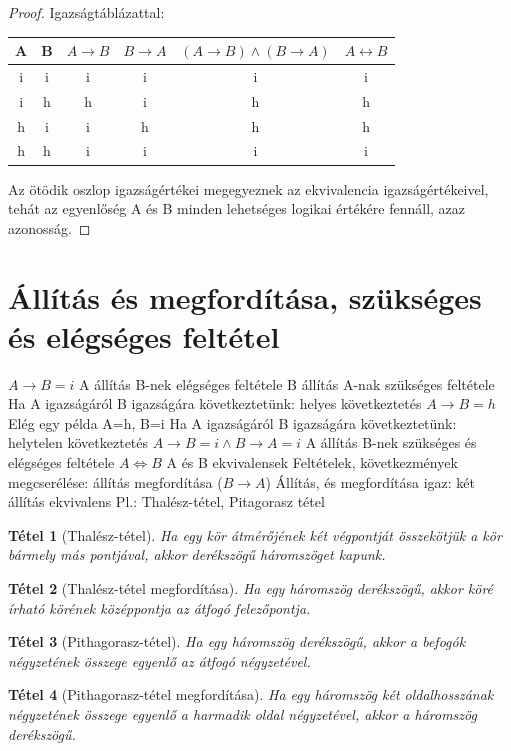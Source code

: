 \documentclass[twoside,12pt]{report}
\newtheorem{theorem}{Tétel}[section]
\theoremstyle{definition}
\begin{document}
	\begin{proof}
		Igazságtáblázattal:
		\begin{table}[H]
			\begin{tabular}{|c|c|c|c|c|c|}
				\hline
				A&B&$A\rightarrow B$&$B\rightarrow A$&$(A\rightarrow B)\wedge(B\rightarrow A)$&$A\leftrightarrow B$\\\hline
				i&i&i&i&i&i\\\hline
				i&h&h&i&h&h\\\hline
				h&i&i&h&h&h\\\hline
				h&h&i&i&i&i\\\hline
			\end{tabular}
		\end{table}
		Az ötödik oszlop igazságértékei megegyeznek az ekvivalencia igazságértékeivel, tehát az
		egyenlőség A és B minden lehetséges logikai értékére fennáll, azaz azonosság.
	\end{proof}
\section{Állítás és megfordítása, szükséges és elégséges feltétel}
	\begin{outline}
		\1 $A\rightarrow B=i$
			\2 A állítás B-nek elégséges feltétele
			\2 B állítás A-nak szükséges feltétele
			\2 Ha A igazságáról B igazságára következtetünk: helyes következtetés
		\1 $A\rightarrow B=h$
			\2 Elég egy példa A=h, B=i
			\2 Ha A igazságáról B igazságára következtetünk: helytelen következtetés
		\1 $A\rightarrow B=i \wedge B\rightarrow A=i$
			\2 A állítás B-nek szükséges és elégséges feltétele
			\2 $A\Leftrightarrow B$
			\2 A és B ekvivalensek
		\1 Feltételek, következmények megcserélése: állítás megfordítása ($B\rightarrow A$)
			\2 Állítás, és megfordítása igaz: két állítás ekvivalens
				\3 Pl.: Thalész-tétel, Pitagorasz tétel
	\end{outline}
	\begin{theorem}[Thalész-tétel]
		Ha egy kör átmérőjének két végpontját összekötjük a kör bármely más
		pontjával, akkor derékszögű háromszöget kapunk.
	\end{theorem}
	\begin{theorem}[Thalész-tétel megfordítása]
		Ha egy háromszög derékszögű, akkor köré írható körének középpontja az átfogó felezőpontja.
	\end{theorem}
	\begin{theorem}[Pithagorasz-tétel]
		Ha egy háromszög derékszögű, akkor a befogók négyzetének összege egyenlő az átfogó négyzetével.
	\end{theorem}
	\begin{theorem}[Pithagorasz-tétel megfordítása]
		Ha egy háromszög két oldalhosszának négyzetének összege egyenlő a harmadik oldal négyzetével, akkor a háromszög derékszögű.
	\end{theorem}
\end{document}
